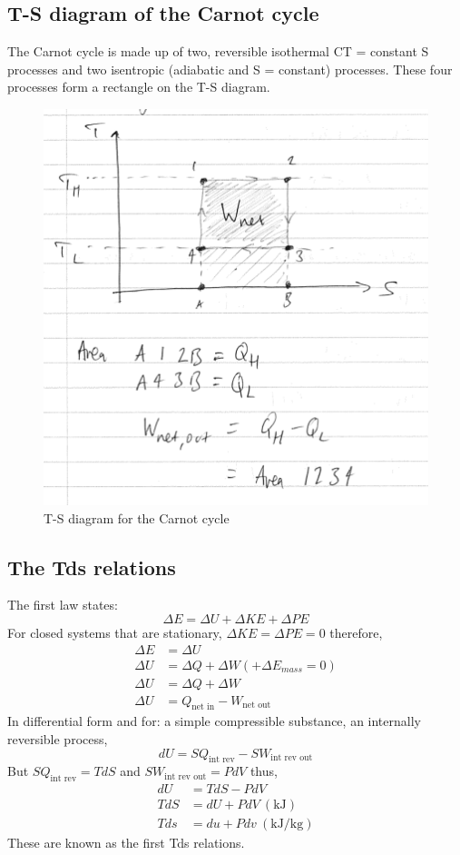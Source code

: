 \documentclass[class=report, crop=false, 12pt,a4paper]{standalone}
\begin{document}
\subsection{T-S diagram of the Carnot cycle}
The Carnot cycle is made up of two, reversible isothermal CT = constant S processes and two isentropic (adiabatic and S = constant) processes. These four processes form a rectangle on the T-S diagram. 
\begin{figure}
  \includegraphics[width = \textwidth]{../img/TSDiagramCarnotCycle}
  \caption{T-S diagram for the Carnot cycle}
\end{figure}
\subsection{The Tds relations}
The first law states:
\[ \Delta E = \Delta U + \Delta KE + \Delta PE \]
For closed systems that are stationary, \( \Delta KE = \Delta PE = 0 \) therefore, 
\begin{align*}
  \Delta E &= \Delta U\\
  \Delta U &= \Delta Q + \Delta W (+ \Delta E_{mass} = 0)\\
  \Delta U &= \Delta Q + \Delta W\\
  \Delta U &= Q_{\textrm{net in}} - W_{\textrm{net out}}
\end{align*}
In differential form and for: a simple compressible substance, an internally reversible process,
\[ dU = SQ_{\textrm{int rev}} - SW_{\textrm{int rev out}} \]
But \( SQ_{\textrm{int rev}} = T dS \) and \( SW_{\textrm{int rev out}} = PdV\) thus,
\begin{align*} 
  dU &= TdS - PdV\\
  TdS &= dU + PdV \ (\si{\kilo\joule})\\
  Tds &= du + Pdv \ (\si{\kilo\joule\per\kg})
\end{align*}
These are known as the first Tds relations.
\end{document}
